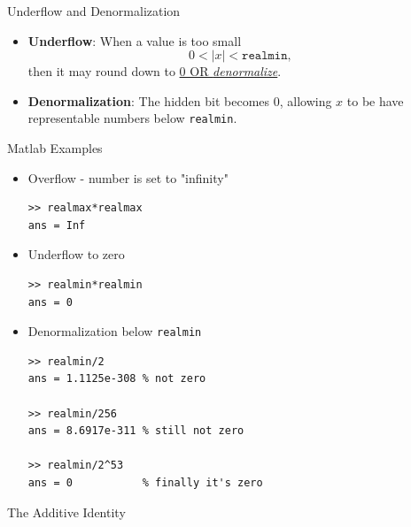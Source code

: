 \documentclass[10pt]{beamer}
\begin{document}
\begin{frame}{Underflow and Denormalization}

\begin{center}
\end{center}

\begin{itemize}
    \item \textbf{Underflow}:  
    When a value is too small 
    \[
    0 < |x| < \texttt{realmin},
    \]
    then it may round down to \underline{0 OR \textit{denormalize}}.
    \item \textbf{Denormalization}: The hidden bit becomes 0, allowing $x$ to be have representable numbers below \texttt{realmin}.
\end{itemize}

\end{frame}
\begin{frame}[fragile]{Matlab Examples}
\begin{itemize}

\item Overflow - number is set to "infinity" 
\begin{lstlisting}
>> realmax*realmax
ans = Inf
\end{lstlisting}

\item Underflow to zero
\begin{lstlisting}
>> realmin*realmin 
ans = 0
\end{lstlisting}

\item Denormalization below \texttt{realmin}
\begin{lstlisting}
>> realmin/2
ans = 1.1125e-308 % not zero

>> realmin/256
ans = 8.6917e-311 % still not zero

>> realmin/2^53
ans = 0           % finally it's zero
\end{lstlisting}

\end{itemize}
\end{frame}



\begin{frame}{The Additive Identity}




\vfill


\end{frame}
\end{document}
